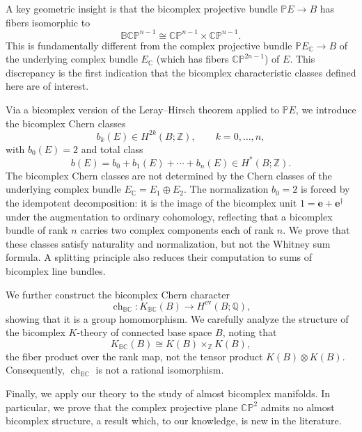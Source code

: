 \documentclass[11pt]{amsart}
\newcommand{\BC}{\mathbb{BC}}       %
\newcommand{\C}{\mathbb{C}}          %
\newcommand{\Z}{\mathbb{Z}}
\newcommand{\ed}{\mathbf{e}^\dagger} %
\theoremstyle{definition}
\begin{document}
A key geometric insight is that the bicomplex projective bundle
$\mathbb{P}E\to B$ has fibers isomorphic to
\begin{equation*}
\mathbb{BCP}^{n-1}\cong\mathbb{CP}^{n-1}\times\mathbb{CP}^{n-1}.
\end{equation*}
This is fundamentally different from the complex projective bundle $\mathbb{P}E_\C\to B$ of the underlying complex bundle $E_\C$ (which has fibers $\mathbb{CP}^{2n-1}$) of $E$. This discrepancy is the first
indication that the bicomplex characteristic classes defined here are of interest.


Via a bicomplex version of the Leray--Hirsch theorem applied to
$\mathbb{P}E$, we introduce the bicomplex Chern classes
\begin{equation*}
b_{k}(E)\in H^{2k}(B;\Z),\qquad k=0,\ldots,n,
\end{equation*}
with $b_{0}(E)=2$ and total class
\begin{equation*}
b(E)=b_0+b_{1}(E)+\cdots+b_{n}(E)\in H^{*}(B;\Z).
\end{equation*}
The bicomplex Chern classes are not determined by the Chern classes of the underlying complex bundle $E_{\mathbb C}=E_1\oplus E_2$. The normalization $b_{0}=2$ is forced by the idempotent decomposition:
it is the image of the bicomplex unit $1=\mathbf{e}+\ed$ under the augmentation to ordinary cohomology, reflecting that a
bicomplex bundle of rank $n$ carries two complex components each of rank $n$. We prove that these classes satisfy naturality and normalization,
but not the Whitney sum formula. A splitting principle also reduces their computation to sums of bicomplex line bundles.


We further construct the bicomplex Chern character
\begin{equation*}
\operatorname{ch}_{\BC}:
K_{\BC}(B)\longrightarrow H^{\mathrm{ev}}(B;\mathbb{Q}),
\end{equation*}
showing that it is a group homomorphism. We carefully analyze the
structure of the bicomplex $K$-theory of connected base space $B$, noting that
\begin{equation*}
K_{\BC}(B)\cong K(B)\times_{\Z}K(B),
\end{equation*}
the fiber product over the rank map, not the tensor product $K(B)\otimes K(B)$. Consequently, $\operatorname{ch}_{\BC}$ is not a rational isomorphism.

Finally, we apply our theory to the study of almost bicomplex manifolds. In particular, we
prove that the complex projective plane $\mathbb{CP}^{2}$ admits no almost bicomplex structure, a result which, to our knowledge, is new in the literature. 
\end{document}
